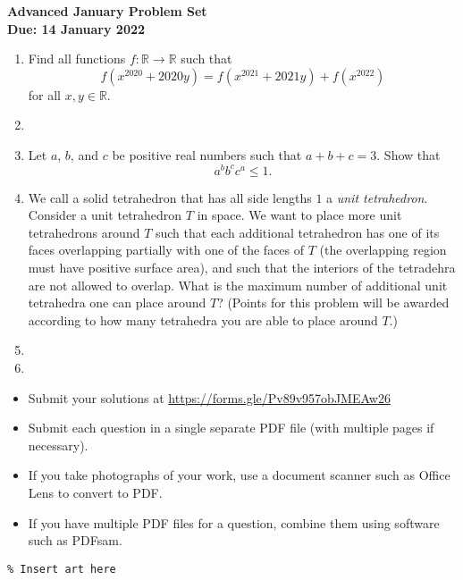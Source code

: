\documentclass{article}
\begin{document}
\thispagestyle{empty}

\begin{center}
  \textbf{\Large Advanced January Problem Set}
  \\ \vspace{1em}
  \textbf{\large Due: 14 January 2022}
\end{center}

\bigskip

\begin{enumerate}[itemsep=\fill]

\item %
Find all functions $f : \mathbb{R} \to \mathbb{R}$ such that
\[ f(x^{2020} +2020y) = f(x^{2021} +2021y) +f(x^{2022}) \]
for all $x,y \in \mathbb{R}$.


\item %


\item %
Let $a$, $b$, and $c$ be positive real numbers such that $a+b+c = 3$.
Show that
\[ a^b b^c c^a \leq 1. \]


\item %
We call a solid tetrahedron that has all side lengths $1$ a \emph{unit tetrahedron}.
Consider a unit tetrahedron $T$ in space.
We want to place more unit tetrahedrons around $T$ such that each additional tetrahedron has one of its faces overlapping partially with one of the faces of $T$ (the overlapping region must have positive surface area), and such that the interiors of the tetradehra are not allowed to overlap.
What is the maximum number of additional unit tetrahedra one can place around $T$?
(Points for this problem will be awarded according to how many tetrahedra you are able to place around $T$.)


\item %


\item %

\end{enumerate}


\vfill
\small
\begin{itemize}
	\item Submit your solutions at \href{https://forms.gle/Pv89v957obJMEAw26}{https://forms.gle/Pv89v957obJMEAw26}
	\item Submit each question in a single separate PDF file (with multiple pages if necessary).
	\item If you take photographs of your work, use a document scanner such as Office Lens to convert to PDF.
	\item If you have multiple PDF files for a question, combine them using software such as PDFsam.
\end{itemize}

\vfill
\centering
\small
\begin{BVerbatim}
\end{BVerbatim}
\end{document}
